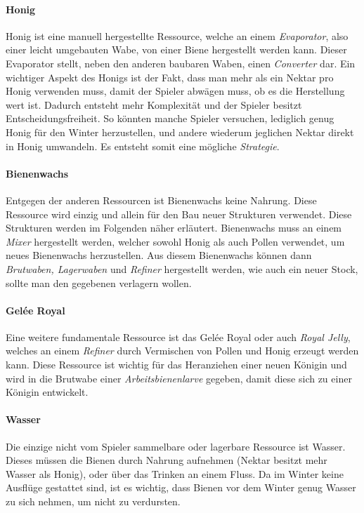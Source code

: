 \paragraph{Honig}
Honig ist eine manuell hergestellte Ressource, welche an einem \textit{Evaporator}, also einer leicht umgebauten Wabe, von einer Biene hergestellt werden kann. Dieser Evaporator stellt, neben den anderen baubaren Waben, einen \textit{Converter} dar. Ein wichtiger Aspekt des Honigs ist der Fakt, dass man mehr als ein Nektar pro Honig verwenden muss, damit der Spieler abwägen muss, ob es die Herstellung wert ist. Dadurch entsteht mehr Komplexität und der Spieler besitzt Entscheidungsfreiheit. So könnten manche Spieler versuchen, lediglich genug Honig für den Winter herzustellen, und andere wiederum jeglichen Nektar direkt in Honig umwandeln. Es entsteht somit eine mögliche \textit{Strategie}.

\paragraph{Bienenwachs}
Entgegen der anderen Ressourcen ist Bienenwachs keine Nahrung. Diese Ressource wird einzig und allein für den Bau neuer Strukturen verwendet. Diese Strukturen werden im Folgenden näher erläutert. Bienenwachs muss an einem \textit{Mixer} hergestellt werden, welcher sowohl Honig als auch Pollen verwendet, um neues Bienenwachs herzustellen. Aus diesem Bienenwachs können dann \textit{Brutwaben, Lagerwaben} und \textit{Refiner} hergestellt werden, wie auch ein neuer Stock, sollte man den gegebenen verlagern wollen.

\paragraph{Gelée Royal}
Eine weitere fundamentale Ressource ist das Gelée Royal oder auch \textit{Royal Jelly}, welches an einem \textit{Refiner} durch Vermischen von Pollen und Honig erzeugt werden kann. Diese Ressource ist wichtig für das Heranziehen einer neuen Königin und wird in die Brutwabe einer \textit{Arbeitsbienenlarve} gegeben, damit diese sich zu einer Königin entwickelt.

\paragraph{Wasser}
Die einzige nicht vom Spieler sammelbare oder lagerbare Ressource ist Wasser. Dieses müssen die Bienen durch Nahrung aufnehmen (Nektar besitzt mehr Wasser als Honig), oder über das Trinken an einem Fluss. Da im Winter keine Ausflüge gestattet sind, ist es wichtig, dass Bienen vor dem Winter genug Wasser zu sich nehmen, um nicht zu verdursten.

